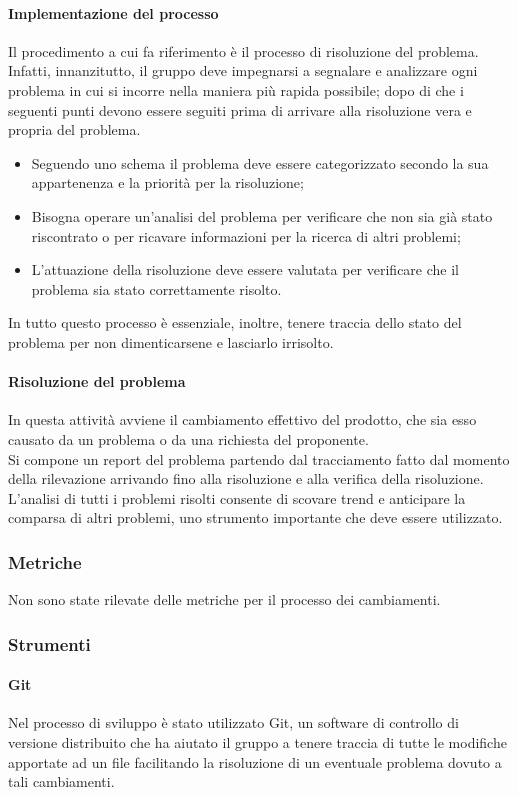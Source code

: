 \paragraph{Implementazione del processo}
Il procedimento a cui fa riferimento è il processo di risoluzione del problema.
Infatti, innanzitutto, il gruppo deve impegnarsi a segnalare e analizzare ogni problema in cui si incorre nella maniera più rapida possibile; dopo di che i seguenti punti devono essere seguiti prima di arrivare alla risoluzione vera e propria del problema.
\begin{itemize}
    \item Seguendo uno schema il problema deve essere categorizzato secondo la sua appartenenza e la priorità per la risoluzione;
    \item Bisogna operare un'analisi del problema per verificare che non sia già stato riscontrato o per ricavare informazioni per la ricerca di altri problemi;
    \item L'attuazione della risoluzione deve essere valutata per verificare che il problema sia stato correttamente risolto.
\end{itemize}
In tutto questo processo è essenziale, inoltre, tenere traccia dello stato del problema per non dimenticarsene e lasciarlo irrisolto.
\paragraph{Risoluzione del problema}
In questa attività avviene il cambiamento effettivo del prodotto, che sia esso causato da un problema o da una richiesta del proponente.\\
Si compone un report del problema partendo dal tracciamento fatto dal momento della rilevazione arrivando fino alla risoluzione e alla verifica della risoluzione.\\
L'analisi di tutti i problemi risolti consente di scovare trend e anticipare la comparsa di altri problemi, uno strumento importante che deve essere utilizzato.
\subsubsection{Metriche}
Non sono state rilevate delle metriche per il processo dei cambiamenti.
\subsubsection{Strumenti}
\paragraph{Git}
Nel processo di sviluppo è stato utilizzato Git, un software di controllo di versione distribuito che ha aiutato il gruppo \Gruppo{} a tenere traccia di tutte le modifiche apportate ad un file facilitando la risoluzione di un eventuale problema dovuto a tali cambiamenti.

